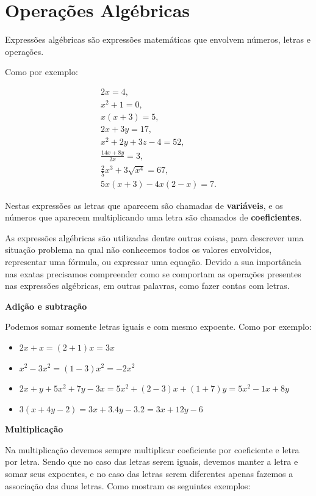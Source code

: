 \chapter{Operações Algébricas}

 Expressões algébricas são expressões matemáticas que envolvem números, letras e operações.

 Como por exemplo:

 \begin{eqnarray*}
  2x=4,\\
  x^2+1=0,\\
  x(x+3)=5,\\
  2x+3y=17,\\
  x^2 + 2y + 3z -4= 52, \\
  \frac{14x + 8y}{2x}= 3, \\
  \frac{2}{5}x^3 + 3\sqrt{x^4}= 67, \\
  5x(x+3)-4x(2-x)=7.
 \end{eqnarray*}

 Nestas expressões as letras que aparecem são chamadas de \textbf{variáveis}, e os números que aparecem multiplicando uma letra são chamados de \textbf{coeficientes}.

 As expressões algébricas são utilizadas dentre outras coisas, para descrever uma situação problema na qual não conhecemos todos os valores envolvidos, representar uma fórmula, ou expressar uma equação. Devido a sua importância nas exatas precisamos compreender como se comportam as operações presentes nas expressões algébricas, em outras palavras, como fazer contas com letras.

 \vskip0.3cm

 \textbf{Adição e subtração}

 Podemos somar somente letras iguais e com mesmo expoente. Como por exemplo:

 \begin{itemize}
  \item $2x + x= (2+1)x= 3x$
  \item $x^2 - 3x^2= (1-3)x^2= -2x^2$
  \item $2x + y + 5x^2 + 7y - 3x= 5x^2 + (2-3)x + (1+7)y= 5x^2 - 1x + 8y$
  \item $3(x+ 4y-2)= 3x + 3.4y - 3.2= 3x + 12y - 6$
 \end{itemize}

  \vskip0.3cm

 \textbf{Multiplicação}

 Na multiplicação devemos sempre multiplicar coeficiente por coeficiente e letra por letra. Sendo que no caso das letras serem iguais, devemos manter a letra e somar seus expoentes, e no caso das letras serem diferentes apenas fazemos a associação das duas letras. Como mostram os seguintes exemplos:

